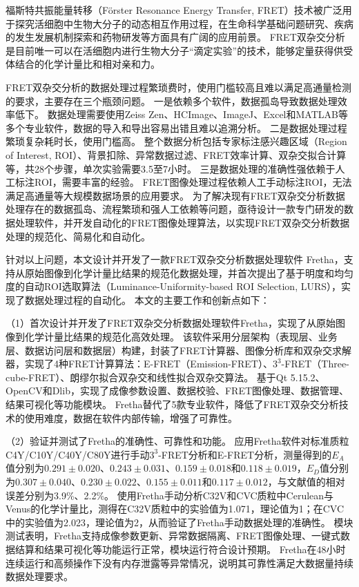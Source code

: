 \begin{cabstract}
福斯特共振能量转移（Förster Resonance Energy Transfer, FRET）技术被广泛用于探究活细胞中生物大分子的动态相互作用过程，在生命科学基础问题研究、疾病的发生发展机制探索和药物研发等方面具有广阔的应用前景。
FRET双杂交分析是目前唯一可以在活细胞内进行生物大分子“滴定实验”的技术，能够定量获得供受体结合的化学计量比和相对亲和力。

FRET双杂交分析的数据处理过程繁琐费时，使用门槛较高且难以满足高通量检测的要求，主要存在三个瓶颈问题。
一是依赖多个软件，数据孤岛导致数据处理效率低下。
数据处理需要使用Zeiss Zen、HCImage、ImageJ、Excel和MATLAB等多个专业软件，数据的导入和导出容易出错且难以追溯分析。
二是数据处理过程繁琐复杂耗时长，使用门槛高。
整个数据分析包括专家标注感兴趣区域（Region of Interest, ROI）、背景扣除、异常数据过滤、FRET效率计算、双杂交拟合计算等，共28个步骤，单次实验需要3.5至7小时。
三是数据处理的准确性强依赖于人工标注ROI，需要丰富的经验。
FRET图像处理过程依赖人工手动标注ROI，无法满足高通量等大规模数据场景的应用要求。
为了解决现有FRET双杂交分析数据处理存在的数据孤岛、流程繁琐和强人工依赖等问题，亟待设计一款专门研发的数据处理软件，并开发自动化的FRET图像处理算法，以实现FRET双杂交分析数据处理的规范化、简易化和自动化。

针对以上问题，本文设计并开发了一款FRET双杂交分析数据处理软件 Fretha，支持从原始图像到化学计量比结果的规范化数据处理，并首次提出了基于明度和均匀度的自动ROI选取算法（Luminance-Uniformity-based ROI Selection, LURS），实现了数据处理过程的自动化。
本文的主要工作和创新点如下：

（1）首次设计并开发了FRET双杂交分析数据处理软件Fretha，实现了从原始图像到化学计量比结果的规范化高效处理。
该软件采用分层架构（表现层、业务层、数据访问层和数据层）构建，封装了FRET计算器、图像分析库和双杂交求解器，实现了4种FRET计算算法：E-FRET（Emission-FRET）、$3^3$-FRET（Three-cube-FRET）、朗缪尔拟合双杂交和线性拟合双杂交算法。
基于Qt 5.15.2、OpenCV和Dlib，实现了成像参数设置、数据校验、FRET图像处理、数据管理、结果可视化等功能模块。
Fretha替代了5款专业软件，降低了FRET双杂交分析技术的使用难度，数据在软件内部传输，增强了可靠性。

（2）验证并测试了Fretha的准确性、可靠性和功能。
应用Fretha软件对标准质粒C4Y/C10Y/C40Y/C80Y进行手动$3^3$-FRET分析和E-FRET分析，测量得到的$E_{A}$值分别为$0.291\pm0.020$、$0.243\pm0.031$、$0.159\pm0.018$和$0.118\pm0.019$，$E_{D}$值分别为$0.307\pm0.040$、$0.230\pm0.022$、$0.155\pm0.011$和$0.117\pm0.012$，与文献值的相对误差分别为3.9\%、2.2\%。
使用Fretha手动分析C32V和CVC质粒中Cerulean与Venus的化学计量比，测得在C32V质粒中的实验值为1.071，理论值为1；在CVC中的实验值为2.023，理论值为2，从而验证了Fretha手动数据处理的准确性。
模块测试表明，Fretha支持成像参数更新、异常数据隔离、FRET图像处理、一键式数据结算和结果可视化等功能运行正常，模块运行符合设计预期。
Fretha在48小时连续运行和高频操作下没有内存泄露等异常情况，说明其可靠性满足大数据量持续数据处理要求。


\end{cabstract}
